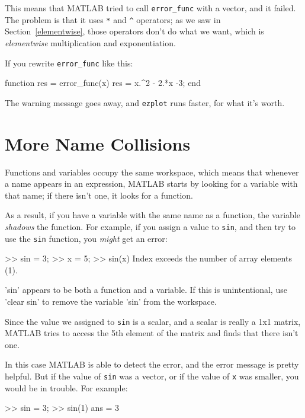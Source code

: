 This means that MATLAB tried to call \verb"error_func" with a vector, and it failed. 
The problem is that it uses \verb"*" and \verb"^" operators; as we saw in Section~\ref{elementwise}, those operators don't do what we want, which is {\em elementwise} multiplication and exponentiation.


If you rewrite \verb"error_func" like this:

\begin{code}
function res = error_func(x)
    res = x.^2 - 2.*x -3;
end
\end{code}

The warning message goes away, and {\tt ezplot} runs faster, for what it's worth.

\section{More Name Collisions}

Functions and variables occupy the same workspace, which means
that whenever a name appears in an expression, MATLAB starts by looking
for a variable with that name; if there isn't one, it looks for
a function.


As a result, if you have a variable with the same name as a function,
the variable {\em shadows} the function.  For example, if you assign
a value to {\tt sin}, and then try to use the {\tt sin} function, you
{\em might} get an error:

\begin{code}
>> sin = 3;
>> x = 5;
>> sin(x)
Index exceeds the number of array elements (1).

'sin' appears to be both a function and a variable.
If this is unintentional, use 'clear sin' to remove 
the variable 'sin' from the workspace.
\end{code}

Since the value we assigned to {\tt sin} is a scalar, and a scalar is really a 1x1 matrix, MATLAB tries to access the 5th element of the matrix and finds that there isn't one.

In this case MATLAB is able to detect the error, and the error message is pretty helpful.
But if the value of {\tt sin} was a vector, or if the value of {\tt x} was smaller, you would be in trouble.  For example:

\begin{code}
>> sin = 3;
>> sin(1)
ans = 3
\end{code}

